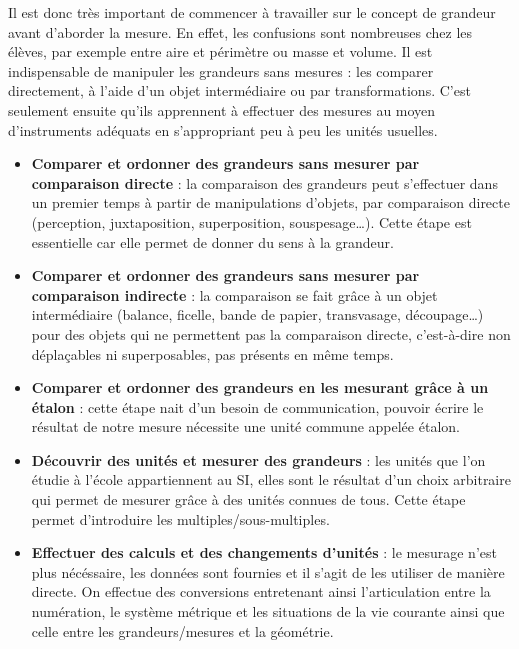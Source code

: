 Il est donc très important de commencer à travailler sur le concept de grandeur avant d'aborder la mesure. En effet, les confusions sont nombreuses chez les élèves, par exemple entre aire et périmètre ou masse et volume. Il est indispensable de manipuler les grandeurs sans mesures : les comparer directement, à l'aide d'un objet intermédiaire ou par transformations. C'est seulement ensuite qu'ils apprennent à effectuer des mesures au moyen d’instruments adéquats en s’appropriant peu à peu les unités usuelles.

{\renewcommand{\StringDOCUMENTATION}{Démarche générale pour conceptualiser les grandeurs}
\begin{documentation}
   \begin{itemize}
      \item {\bf Comparer et ordonner des grandeurs sans mesurer par comparaison directe} : la comparaison des grandeurs peut s’effectuer dans un premier temps à partir de manipulations d’objets, par comparaison directe (perception, juxtaposition, superposition, souspesage\dots). Cette étape est essentielle car elle permet de donner du sens à la grandeur.
      \item {\bf Comparer et ordonner des grandeurs sans mesurer par comparaison indirecte} : la comparaison se fait grâce à un objet intermédiaire (balance, ficelle, bande de papier, transvasage, découpage\dots) pour des objets qui ne permettent pas la comparaison directe, c'est-à-dire non déplaçables ni superposables, pas présents en même temps.
      \item {\bf Comparer et ordonner des grandeurs en les mesurant grâce à un étalon} : cette étape nait d'un besoin de communication, pouvoir écrire le résultat de notre mesure nécessite une unité commune appelée étalon.
      \item {\bf Découvrir des unités et mesurer des grandeurs} : les unités que l’on étudie à l’école appartiennent au SI, elles sont le résultat d’un choix arbitraire qui permet de mesurer grâce à des unités connues de tous. Cette étape permet d'introduire les multiples/sous-multiples.
      \item {\bf Effectuer des calculs et des changements d’unités} : le mesurage n'est plus nécéssaire, les données sont fournies et il s'agit de les utiliser de manière directe. On effectue des conversions entretenant ainsi l'articulation entre la numération, le système métrique et les situations de la vie courante ainsi que celle entre les grandeurs/mesures et la géométrie. \\ [-8mm]
   \end{itemize}
\end{documentation}

}
